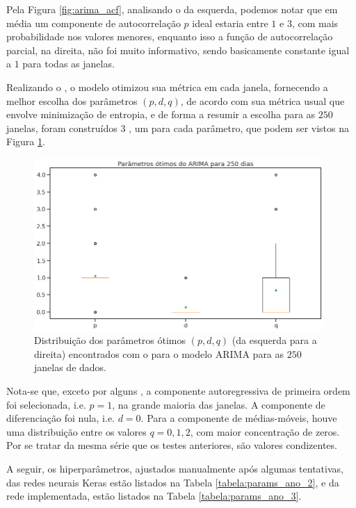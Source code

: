 Pela Figura \ref{fig:arima_acf}, analisando o  da esquerda, podemos notar que em média um componente de autocorrelação $p$ ideal estaria entre $1$ e $3$, com mais probabilidade nos valores menores, enquanto isso a função de autocorrelação parcial, na direita, não foi muito informativo, sendo basicamente constante igual a $1$ para todas as janelas.

Realizando o , o modelo otimizou sua métrica em cada janela, fornecendo a melhor escolha dos parâmetros $(p, d, q)$, de acordo com sua métrica usual que envolve minimização de entropia, e de forma a resumir a escolha para as $250$ janelas, foram construídos $3$ , um para cada parâmetro, que podem ser vistos na Figura \ref{fig:arima_boxplot}.

\begin{figure}[htb]
\centering
\includegraphics[width=11cm]{figuras/arima_boxplot}
\caption{Distribuição dos parâmetros ótimos $(p, d, q)$ (da esquerda para a direita) encontrados com o  para o modelo ARIMA para as $250$ janelas de dados.}
\label{fig:arima_boxplot}
\end{figure}

Nota-se que, exceto por alguns , a componente autoregressiva de primeira ordem foi selecionada, i.e. $p = 1$, na grande maioria das janelas. A componente de diferenciação foi nula, i.e. $d = 0$. Para a componente de médias-móveis, houve uma distribuição entre os valores $q = 0, 1, 2$, com maior concentração de zeros. Por se tratar da mesma série que os testes anteriores, são valores condizentes.

A seguir, os hiperparâmetros, ajustados manualmente após algumas tentativas, das redes neurais Keras estão listados na Tabela \ref{tabela:params_ano_2}, e da rede  implementada, estão listados na Tabela \ref{tabela:params_ano_3}.

